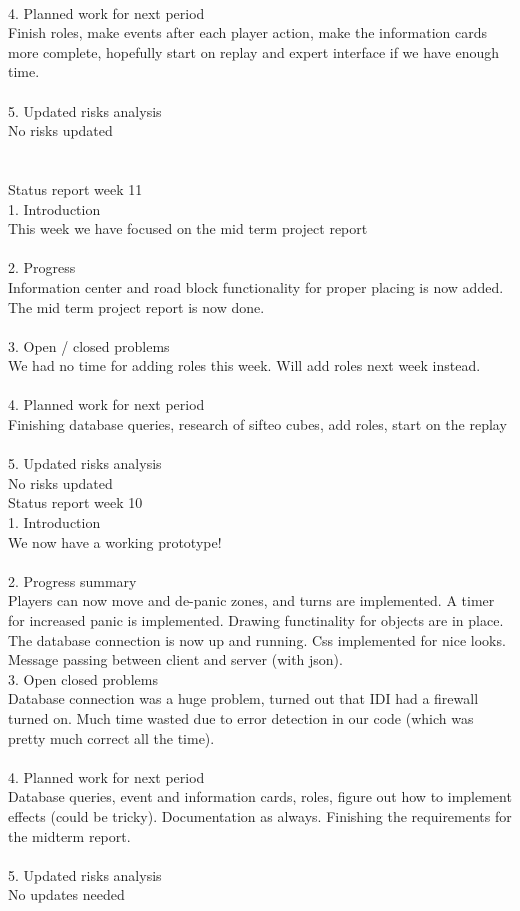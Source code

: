 \\
4. Planned work for next period\\
Finish roles, make events after each player action, make the information cards more complete, hopefully start on replay and expert interface if we have enough time.\\
\\
5. Updated risks analysis\\
No risks updated\\
\\
\\
Status report week 11\\
1. Introduction\\
This week we have focused on the mid term project report\\
\\
2. Progress\\
Information center and road block functionality for proper placing is now added. The mid term project report is now done. \\
\\
3. Open / closed problems\\
We had no time for adding roles this week. Will add roles next week instead. \\
\\
4. Planned work for next period\\
Finishing database queries, research of sifteo cubes, add roles, start on the replay\\
\\
5. Updated risks analysis\\
No risks updated\\

Status report week 10\\
1. Introduction\\
We now have a working prototype!\\
\\
2. Progress summary\\
Players can now move and de-panic zones, and turns are implemented. A timer for increased panic is implemented. Drawing functinality for objects are in place. The database connection is now up and running. Css implemented for nice looks. Message passing between client and server (with json).
\\
3. Open closed problems\\
Database connection was a huge problem, turned out that IDI had a firewall turned on. Much time wasted due to error detection in our code (which was pretty much correct all the time).\\
\\
4. Planned work for next period\\
Database queries, event and information cards, roles, figure out how to implement effects (could be tricky). Documentation as always. Finishing the requirements for the midterm report.\\
\\
5. Updated risks analysis\\
No updates needed\\
\\

